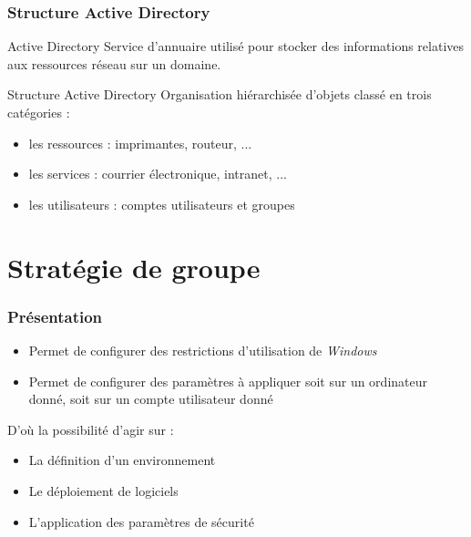 \documentclass{beamer}
\begin{document}
  \begin{frame}
    \frametitle{Structure Active Directory}
    \begin{block}{Active Directory}
      Service d'annuaire utilisé pour stocker des informations relatives aux ressources réseau sur un domaine.
    \end{block}    
    \begin{block}{Structure Active Directory}
      Organisation hiérarchisée d'objets classé en trois catégories :
      \begin{itemize}
       \item les ressources : imprimantes, routeur, ...
       \item les services : courrier électronique, intranet, ...
       \item les utilisateurs : comptes utilisateurs et groupes
      \end{itemize}
    \end{block}
  \end{frame}

  \section{Stratégie de groupe}
  \begin{frame}
    \frametitle{Présentation}
    \begin{itemize}
     \item Permet de configurer des restrictions d'utilisation de \textit{Windows} 
     \item Permet de configurer des paramètres à appliquer soit sur un ordinateur donné, soit sur un compte utilisateur donné
    \end{itemize}
    D'où la possibilité d'agir sur :
    \begin{itemize}
     \item La définition d'un environnement
     \item Le déploiement de logiciels
     \item L'application des paramètres de sécurité
    \end{itemize}
  \end{frame}
  
\end{document}

